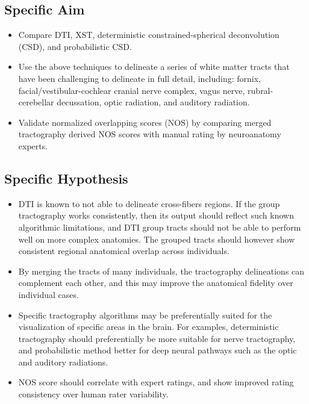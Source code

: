 \subsection{Specific Aim}
\begin{itemize}
    \item Compare DTI, XST, deterministic constrained-spherical deconvolution (CSD), and probabilistic CSD. 
    \item Use the above techniques to delineate a series of white matter tracts that have been challenging to delineate in full detail, including: fornix, facial/vestibular-cochlear cranial nerve complex, vagus nerve, rubral-cerebellar decussation, optic radiation, and auditory radiation.
    \item Validate normalized overlapping scores (NOS) by comparing merged tractography derived NOS scores with manual rating by neuroanatomy experts.
\end{itemize}

\subsection{Specific Hypothesis}
\begin{itemize}
    \item DTI is known to not able to delineate cross-fibers regions. If the group tractography works consistently, then its output should reflect such known algorithmic limitations, and DTI group tracts should not be able to perform well on more complex anatomies. The grouped tracts should however show consistent regional anatomical overlap across individuals.
    \item By merging the tracts of many individuals, the tractography delineations can complement each other, and this may improve the anatomical fidelity over individual cases.
    \item Specific tractography algorithms may be preferentially suited for the visualization of specific areas in the brain. For examples, deterministic tractography should preferentially be more suitable for nerve tractography, and probabilistic method better for deep neural pathways such as the optic and auditory radiations.
    \item NOS score should correlate with expert ratings, and show improved rating consistency over human rater variability.
\end{itemize}

